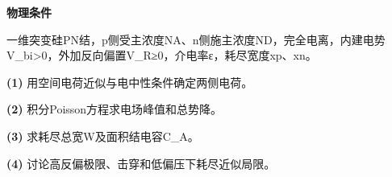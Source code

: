 \textbf{物理条件}\par 一维突变硅PN结，p侧受主浓度NA、n侧施主浓度ND，完全电离，内建电势V\_bi>0，外加反向偏置V\_R≥0，介电率ε，耗尽宽度xp、xn。
\par\noindent\textbf{(1)} 用空间电荷近似与电中性条件确定两侧电荷。
\par\noindent\textbf{(2)} 积分Poisson方程求电场峰值和总势降。
\par\noindent\textbf{(3)} 求耗尽总宽W及面积结电容C\_A。
\par\noindent\textbf{(4)} 讨论高反偏极限、击穿和低偏压下耗尽近似局限。
